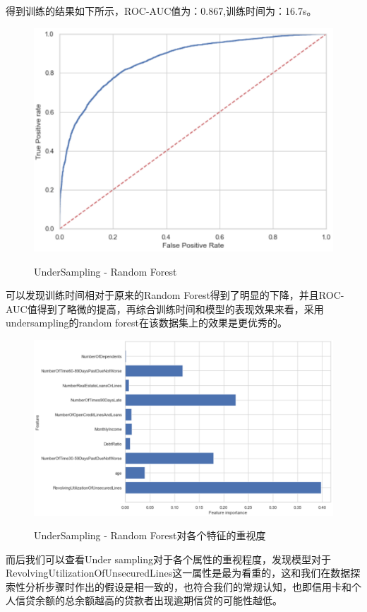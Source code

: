 \documentclass{zjureport}
\begin{document}
    得到训练的结果如下所示，ROC-AUC值为：0.867,训练时间为：16.7s。
    \begin{figure}[H]
    \centering
    \includegraphics[scale=0.65]{figures/rf2.png}\\
    \caption{UnderSampling - Random Forest}
    \end{figure}
    
    可以发现训练时间相对于原来的Random Forest得到了明显的下降，并且ROC-AUC值得到了略微的提高，再综合训练时间和模型的表现效果来看，采用undersampling的random forest在该数据集上的效果是更优秀的。
    \begin{figure}[H]
    \centering
    \includegraphics[scale=0.55]{figures/rf3.png}\\
    \caption{UnderSampling - Random Forest对各个特征的重视度}
    \end{figure}
    而后我们可以查看Under sampling对于各个属性的重视程度，发现模型对于RevolvingUtilizationOfUnsecuredLines这一属性是最为看重的，这和我们在数据探索性分析步骤时作出的假设是相一致的，也符合我们的常规认知，也即信用卡和个人信贷余额的总余额越高的贷款者出现逾期信贷的可能性越低。
\end{document}
